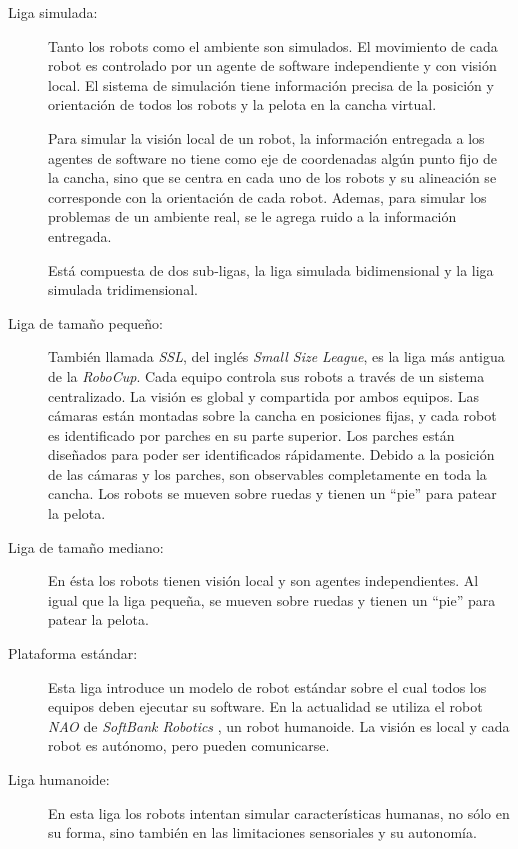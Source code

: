 \begin{description}

	\item[Liga simulada:] Tanto los robots como el ambiente son simulados.
		El movimiento de cada robot es controlado por un agente de
		software independiente y con visión local. El sistema de
		simulación tiene información precisa de la posición y
		orientación de todos los robots y la pelota en la cancha
		virtual.

		Para simular la visión local de un robot, la información
		entregada a los agentes de software no tiene como eje de
		coordenadas algún punto fijo de la cancha, sino que se centra en
		cada uno de los robots y su alineación se corresponde con la
		orientación de cada robot. Ademas, para simular los problemas de
		un ambiente real, se le agrega ruido a la información entregada.

		Está compuesta de dos sub-ligas, la liga simulada
		bidimensional y la liga simulada tridimensional.

	\item[Liga de tamaño pequeño:] También llamada \emph{SSL}, del inglés
		\emph{Small Size League}, es la liga más antigua de la
		\emph{RoboCup}. Cada equipo controla sus robots a través de un
		sistema centralizado. La visión es global y compartida por ambos
		equipos. Las cámaras están montadas sobre la cancha en
		posiciones fijas, y cada robot es identificado por parches en su
		parte superior. Los parches están diseñados para poder ser
		identificados rápidamente. Debido a la posición de las cámaras y
		los parches, son observables completamente en toda la cancha.
		Los robots se mueven sobre ruedas y tienen un ``pie'' para
		patear la pelota.

	\item[Liga de tamaño mediano:] En ésta los robots tienen visión local
		y son agentes independientes. Al igual que la liga pequeña, se
		mueven sobre ruedas y tienen un ``pie'' para patear la pelota.

	\item[Plataforma estándar:] Esta liga introduce un modelo de robot
		estándar sobre el cual todos los equipos deben ejecutar su
		software. En la actualidad se utiliza el robot \emph{NAO} de
		\emph{SoftBank Robotics} \cite{robotics2017nao}, un robot
		humanoide. La visión es local y cada robot es autónomo, pero
		pueden comunicarse.

	\item[Liga humanoide:] En esta liga los robots intentan simular
		características humanas, no sólo en su forma, sino también en
		las limitaciones sensoriales y su autonomía.

\end{description}

